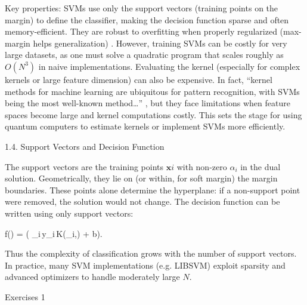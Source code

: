 Key properties: SVMs use only the support vectors (training points on the margin) to define the classifier, making the decision function sparse and often memory-efficient.  They are robust to overfitting when properly regularized (max-margin helps generalization) .  However, training SVMs can be costly for very large datasets, as one must solve a quadratic program that scales roughly as $O(N^3)$ in naive implementations.  Evaluating the kernel (especially for complex kernels or large feature dimension) can also be expensive.  In fact, “kernel methods for machine learning are ubiquitous for pattern recognition, with SVMs being the most well-known method…” , but they face limitations when feature spaces become large and kernel computations costly.  This sets the stage for using quantum computers to estimate kernels or implement SVMs more efficiently.





1.4. Support Vectors and Decision Function





The support vectors are the training points $\mathbf{x}i$ with non-zero $\alpha_i$ in the dual solution.  Geometrically, they lie on (or within, for soft margin) the margin boundaries.  These points alone determine the hyperplane: if a non-support point were removed, the solution would not change.  The decision function can be written using only support vectors:

f() = \Bigl( \alpha_i\,y_i\,K(_i,) + b\Bigr).

Thus the complexity of classification grows with the number of support vectors.  In practice, many SVM implementations (e.g. LIBSVM) exploit sparsity and advanced optimizers to handle moderately large $N$.





Exercises 1





